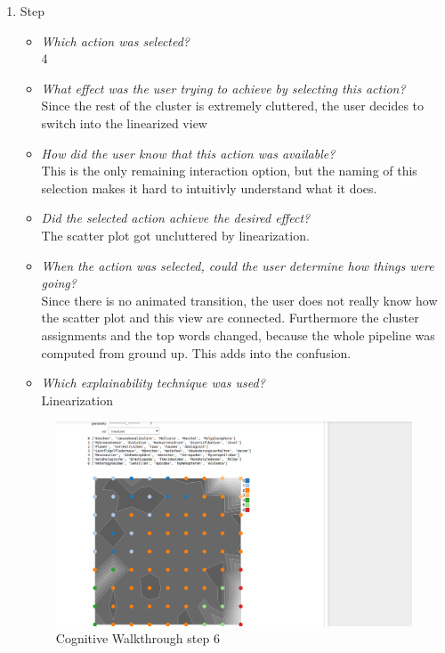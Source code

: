 {\begin{enumerate}
		\item Step
		\begin{itemize}
			\item \textit{Which action was selected?} \\
			4
			\item \textit{What effect was the user trying to achieve by selecting this action?} \\
			Since the rest of the cluster is extremely cluttered, the user decides to switch into the linearized view 
			\item \textit{How did the user know that this action was available?} \\
			This is the only remaining interaction option, but the naming of this selection makes it hard to intuitivly understand what it does. 
			\item \textit{Did the selected action achieve the desired effect?} \\
			The scatter plot got uncluttered by linearization. 
			\item \textit{When the action was selected, could the user determine how things were going?} \\
			Since there is no animated transition, the user does not really know how the scatter plot and this view are connected. Furthermore the cluster assignments and the top words changed, because the whole pipeline was computed from ground up. This adds into the confusion.
			\item \textit{Which explainability technique was used?}\\
			Linearization
		\end{itemize}
		\begin{figure}[H]
			\centering
			\includegraphics[width=400px]{../chapters/validation/pics/5_c}
			\caption{\label{pic:step6} Cognitive Walkthrough step 6}
		\end{figure} \newpage
		

\end{enumerate}}
